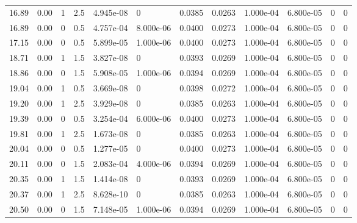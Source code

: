 \documentclass[preview]{standalone}
\begin{document}
{{{\begin{tabular}{L{1.2cm}C{1.2cm} C{0.3cm}C{0.5cm} C{1.4cm}C{1.4cm} C{1.4cm}C{1.4cm} C{1.6cm}C{1.6cm} C{1.6cm}C{1.6cm}}
  16.89  &  0.00  & 1     & 2.5 &  4.945e-08  & 0  &  0.0385&   0.0263& 1.000e-04 & 6.800e-05   &  0 & 0  \\ 
  16.89  &  0.00  & 0     & 0.5 &  4.757e-04  & 8.000e-06  &  0.0400&   0.0273& 1.000e-04 & 6.800e-05   &  0 & 0  \\ 
  17.15  &  0.00  & 0     & 0.5 &  5.899e-05  & 1.000e-06  &  0.0400&   0.0273& 1.000e-04 & 6.800e-05   &  0 & 0  \\ 
  18.71  &  0.00  & 1     & 1.5 &  3.827e-08  & 0  &  0.0393&   0.0269& 1.000e-04 & 6.800e-05   &  0 & 0  \\ 
  18.86  &  0.00  & 0     & 1.5 &  5.908e-05  & 1.000e-06  &  0.0394&   0.0269& 1.000e-04 & 6.800e-05   &  0 & 0  \\ 
  19.04  &  0.00  & 1     & 0.5 &  3.669e-08  & 0  &  0.0398&   0.0272& 1.000e-04 & 6.800e-05   &  0 & 0  \\ 
  19.20  &  0.00  & 1     & 2.5 &  3.929e-08  & 0  &  0.0385&   0.0263& 1.000e-04 & 6.800e-05   &  0 & 0  \\ 
  19.39  &  0.00  & 0     & 0.5 &  3.254e-04  & 6.000e-06  &  0.0400&   0.0273& 1.000e-04 & 6.800e-05   &  0 & 0  \\ 
  19.81  &  0.00  & 1     & 2.5 &  1.673e-08  & 0  &  0.0385&   0.0263& 1.000e-04 & 6.800e-05   &  0 & 0  \\ 
  20.04  &  0.00  & 0     & 0.5 &  1.277e-05  & 0  &  0.0400&   0.0273& 1.000e-04 & 6.800e-05   &  0 & 0  \\ 
  20.11  &  0.00  & 0     & 1.5 &  2.083e-04  & 4.000e-06  &  0.0394&   0.0269& 1.000e-04 & 6.800e-05   &  0 & 0  \\ 
  20.35  &  0.00  & 1     & 1.5 &  1.414e-08  & 0  &  0.0393&   0.0269& 1.000e-04 & 6.800e-05   &  0 & 0  \\ 
  20.37  &  0.00  & 1     & 2.5 &  8.628e-10  & 0  &  0.0385&   0.0263& 1.000e-04 & 6.800e-05   &  0 & 0  \\ 
  20.50  &  0.00  & 0     & 1.5 &  7.148e-05  & 1.000e-06  &  0.0394&   0.0269& 1.000e-04 & 6.800e-05   &  0 & 0  \\ 
\hline 
\end{tabular} 

}}}
\end{document}
